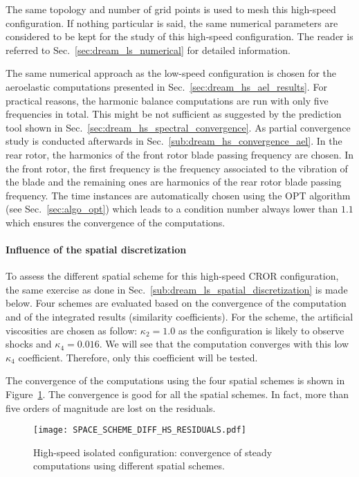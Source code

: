 
The same topology and number of grid points is used to
mesh this high-speed configuration. 
If nothing particular is said, the same numerical parameters
are considered to be kept for the study of this
high-speed configuration.
The reader is referred to 
Sec.~\ref{sec:dream_ls_numerical} for detailed information.

The same numerical approach as the low-speed configuration
is chosen for the aeroelastic computations presented in
Sec.~\ref{sec:dream_hs_ael_results}.
For practical reasons, the harmonic balance computations are run with
only five frequencies in total. This might be not sufficient
as suggested by the prediction tool shown in 
Sec.~\ref{sec:dream_hs_spectral_convergence}. As partial 
convergence study is conducted afterwards in Sec.~\ref{sub:dream_hs_convergence_ael}.
In the rear rotor,
the harmonics of the front rotor blade passing frequency
are chosen. In the front rotor, the first frequency is the
frequency associated to the vibration of the blade and the
remaining ones are harmonics of the rear rotor blade 
passing frequency. 
The time instances are automatically chosen using the OPT
algorithm (see Sec.~\ref{sec:algo_opt}) which leads to 
a condition number always lower than $1.1$ which ensures
the convergence of the computations.

\paragraph{Influence of the spatial discretization}
\label{sub:dream_hs_spatial_discretization}

To assess the different spatial scheme for this high-speed
CROR configuration, the same exercise as done in 
Sec.~\ref{sub:dream_ls_spatial_discretization} is made below.
Four schemes are evaluated based 
on the convergence of the computation
and of the integrated 
results (similarity coefficients).
For the \citet{Jameson1981} scheme, the artificial viscosities
are chosen as follow: $\kappa_2 = 1.0$ as the configuration is likely to 
observe shocks and $\kappa_4 = 0.016$. We will see that the computation converges
with this low $\kappa_4$ coefficient. Therefore, only this coefficient
will be tested.

The convergence of the computations using the four spatial schemes
is shown in Figure~\ref{fig:DREAM_HS_RESIDUALS_PPT}. The convergence is good
for all the spatial schemes. In fact, more than five orders of magnitude
are lost on the residuals.
\begin{figure}[htp]
  \centering
  \texttt{[image: SPACE\_SCHEME\_DIFF\_HS\_RESIDUALS.pdf]}
  \caption{High-speed isolated configuration: convergence 
  of steady computations using different spatial schemes.}
  \label{fig:DREAM_HS_RESIDUALS_PPT}
\end{figure}

